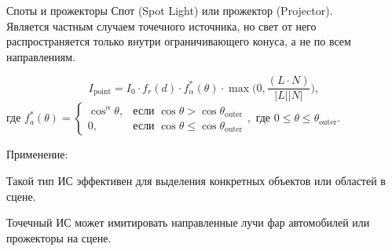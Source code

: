 \documentclass{beamer}
\begin{document}
	
	\begin{frame}{Споты и прожекторы}
		Спот (Spot Light) или прожектор (Projector). \\
		
		Является частным случаем точечного источника, но свет от него распространяется только внутри ограничивающего конуса, а не по всем направлениям.



		\[
			I_{\text{point}} = I_0 \cdot f_r(d) \cdot f^*_{\alpha}(\theta) \cdot 
			\max \bigg( 0, \frac{(L \cdot N)}{\lvert L \rvert \lvert N \rvert} \bigg)
			,
		\]
		где 
		$
			f^*_a(\theta) = \begin{cases} 
			\cos^{\alpha} \theta, & \text{если } \cos \theta > \cos \theta_{\text{outer}} \\
			0, & \text{если } \cos \theta \leq \cos \theta_{\text{outer}}
			\end{cases}
			,
		$ 
		где 
		$0 \le \theta \le \theta_{\text{outer}}$.

		Применение:

		Такой тип ИС эффективен для выделения конкретных объектов или областей в сцене.
		
		Точечный ИС может имитировать направленные лучи фар автомобилей или прожекторы на сцене.

	\end{frame}
\end{document}
